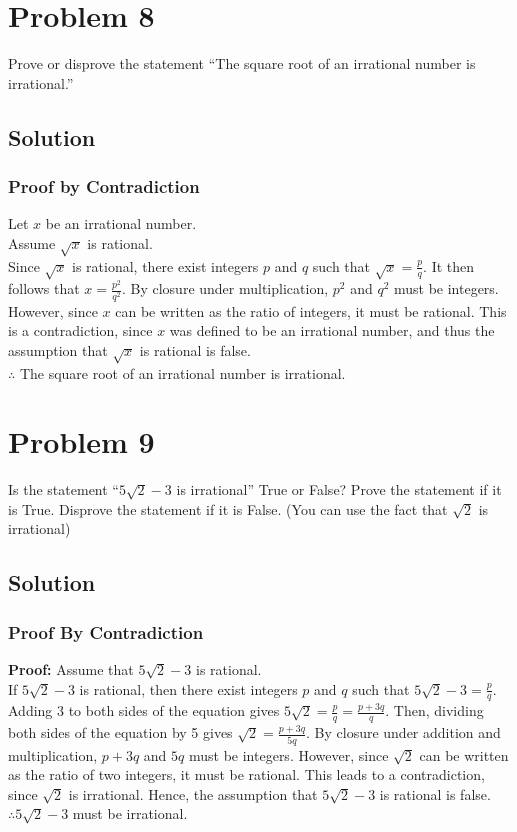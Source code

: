 \documentclass[table]{article}
\begin{document}
\section{Problem 8}
Prove or disprove the statement ``The square root of an irrational number is irrational.''
\subsection{Solution}
\subsubsection{Proof by Contradiction}
Let $x$ be an irrational number.\\
Assume $\sqrt{x}$ is rational.\\
Since $\sqrt{x}$ is rational, there exist integers $p$ and $q$ such that $\sqrt{x}=\frac{p}{q}$. It then follows that $x=\frac{p^2}{q^2}$. By closure under multiplication, $p^2$ and $q^2$ must be integers. However, since $x$ can be written as the ratio of integers, it must be rational. This is a contradiction, since $x$ was defined to be an irrational number, and thus the assumption that $\sqrt{x}$ is rational is false.\\
$\therefore$ The square root of an irrational number is irrational.
\section{Problem 9}
Is the statement ``$5\sqrt{2} - 3$ is irrational'' True or False? Prove the statement if it is True.
Disprove the statement if it is False. (You can use the fact that $\sqrt{2}$ is irrational)
\subsection{Solution}
\subsubsection{Proof By Contradiction}
\textbf{Proof:} Assume that $5\sqrt{2} - 3$ is rational.\\
If $5\sqrt{2} - 3$ is rational, then there exist integers $p$ and $q$ such that $5\sqrt{2} - 3 = \frac{p}{q}$. Adding $3$ to both sides of the equation gives $5\sqrt{2} = \frac{p}{q} = \frac{p+3q}{q}$. Then, dividing both sides of the equation by 5 gives $\sqrt{2} = \frac{p+3q}{5q}$. By closure under addition and multiplication, $p+3q$ and $5q$ must be integers. However, since $\sqrt{2}$ can be written as the ratio of two integers, it must be rational. This leads to a contradiction, since $\sqrt{2}$ is irrational. Hence, the assumption that $5\sqrt{2} - 3$ is rational is false.\\
$\therefore 5\sqrt{2} - 3$ must be irrational.
\end{document}
